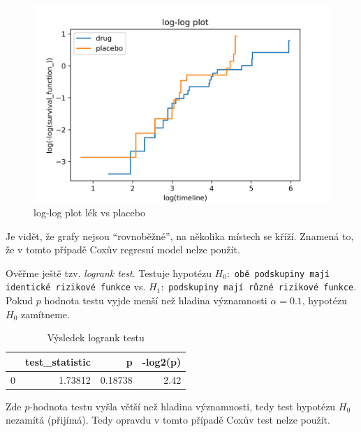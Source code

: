 \documentclass[a4, 11pt]{article}
\newcommand{\uvoz}[1]{``{#1}''}                        %
\theoremstyle{definition}
\theoremstyle{remark}
\begin{document}
	\begin{figure}[H]
		\centering
		\includegraphics[width=0.6\linewidth]{img/loglogplot_KM.png}
	 	\caption{log-log plot lék vs placebo}
	 	\label{fig:loglogplot_drug_vs_placebo}
	\end{figure}
	
	Je vidět, že grafy nejsou \uvoz{rovnoběžné}, na několika místech se kříží. 
    Znamená to, že v tomto případě Coxův regresní model nelze použít. 
    
    Ověřme ještě tzv. \textit{logrank test}.
    Testuje hypotézu $H_0: $ \texttt{obě podskupiny mají identické rizikové funkce} vs. $H_1: $ \texttt{podskupiny mají různé rizikové funkce}. Pokud $p$ hodnota testu vyjde menší než hladina významnosti $\alpha = 0.1$, hypotézu $H_0$ zamítneme. 
    
    
    \begin{table}[H]
        \centering
    \begin{tabular}{lrrr}
        \toprule
        & \textbf{test\_statistic} & \textbf{p} & \textbf{-log2(p)} \\ \midrule
        0 & 1.73812 & 0.18738 & 2.42 \\
        \bottomrule
    \end{tabular}
    \caption{Výsledek logrank testu}
    \label{tab:logrank_test}
    \end{table}
    
    Zde $p$-hodnota testu vyšla větší než hladina významnosti, tedy test hypotézu $H_0$ nezamítá (přijímá). Tedy opravdu v tomto případě Coxův test nelze použít.
     
\end{document}
